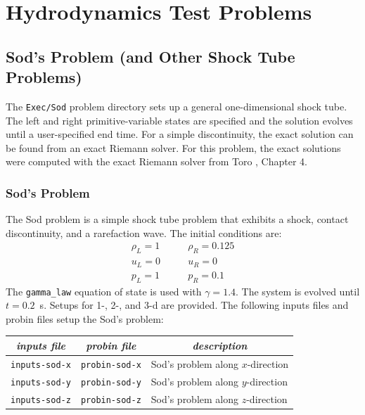 
\section{Hydrodynamics Test Problems}

\subsection{Sod's Problem (and Other Shock Tube Problems)}

The {\tt Exec/Sod} problem directory sets up a general one-dimensional
shock tube.  The left and right primitive-variable states are specified
and the solution evolves until a user-specified end time.  For a simple
discontinuity, the exact solution can be found from an exact Riemann 
solver.  For this problem, the exact solutions were computed with the
exact Riemann solver from Toro \cite{toro:1997}, Chapter 4.

\subsubsection{Sod's Problem}

The Sod problem \cite{sod:1978} is a simple shock tube problem that
exhibits a shock, contact discontinuity, and a rarefaction wave.
The initial conditions are:
\begin{equation}
\begin{array}{l}
\rho_L = 1 \\
u_L = 0 \\
p_L = 1
\end{array}
\qquad
\begin{array}{l}
\rho_R = 0.125 \\
u_R = 0 \\
p_R = 0.1
\end{array}
\end{equation}
The {\tt gamma\_law} equation of state is used with $\gamma = 1.4$.
The system is evolved until $t = 0.2$~s.  Setups for 1-, 2-, and 3-d
are provided.  The following inputs files and probin files setup the
Sod's problem:
\begin{table}[h]
\centering
\begin{tabular}{|l|l|l|} \hline
\multicolumn{1}{|c}{\em inputs file} &  \multicolumn{1}{|c}{\em probin file} & \multicolumn{1}{|c|}{\em description} \\
\hline
{\tt inputs-sod-x} & {\tt probin-sod-x} & Sod's problem along $x$-direction \\
{\tt inputs-sod-y} & {\tt probin-sod-y} & Sod's problem along $y$-direction \\
{\tt inputs-sod-z} & {\tt probin-sod-z} & Sod's problem along $z$-direction \\
\hline
\end{tabular}
\label{Table:Sod}
\end{table}

